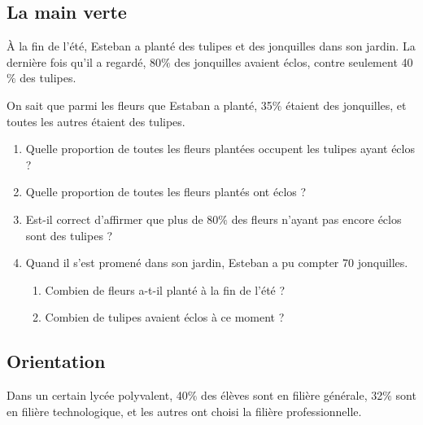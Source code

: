 \documentclass[oneside,12pt]{article}          %
\begin{document}
\subsection{La main verte}
À la fin de l'été, Esteban a planté des tulipes et des jonquilles dans son jardin. La dernière fois qu'il a regardé, 80$\%$ des jonquilles avaient éclos, contre seulement 40$\%$ des tulipes.

On sait que parmi les fleurs que Estaban a planté, 35$\%$ étaient des jonquilles, et toutes les autres étaient des tulipes.
\begin{enumerate}
    \item Quelle proportion de toutes les fleurs plantées occupent les tulipes ayant éclos ?
    \item Quelle proportion de toutes les fleurs plantés ont éclos ?
    \item Est-il correct d'affirmer que plus de 80$\%$ des fleurs n'ayant pas encore éclos sont des tulipes ?
    \item Quand il s'est promené dans son jardin, Esteban a pu compter 70 jonquilles.
    \begin{enumerate}
        \item Combien de fleurs a-t-il planté à la fin de l'été ?
        \item Combien de tulipes avaient éclos à ce moment ?
    \end{enumerate}
\end{enumerate}



\subsection{Orientation}
Dans un certain lycée polyvalent, 40$\%$ des élèves sont en filière générale, 32$\%$ sont en filière technologique, et les autres ont choisi la filière professionnelle.
\end{document}
